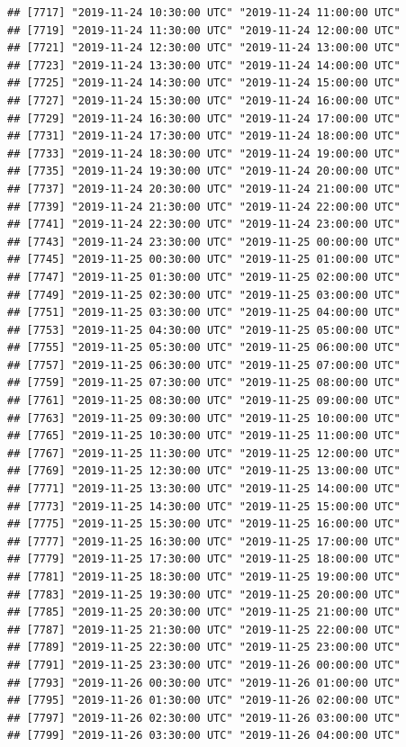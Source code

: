 \documentclass{article}\usepackage[]{graphicx}\usepackage[]{color}
\makeatletter
\newenvironment{kframe}{%
 \def\at@end@of@kframe{}%
 \ifinner\ifhmode%
  \def\at@end@of@kframe{\end{minipage}}%
  \begin{minipage}{\columnwidth}%
 \fi\fi%
 \def\FrameCommand##1{\hskip\@totalleftmargin \hskip-\fboxsep
 \colorbox{shadecolor}{##1}\hskip-\fboxsep
     \hskip-\linewidth \hskip-\@totalleftmargin \hskip\columnwidth}%
 \MakeFramed {\advance\hsize-\width
   \@totalleftmargin\z@ \linewidth\hsize
   \@setminipage}}%
 {\par\unskip\endMakeFramed%
 \at@end@of@kframe}
\newenvironment{knitrout}{}{} %
\makeatother
\begin{document}
\begin{knitrout}
\begin{kframe}
\begin{verbatim}
## [7717] "2019-11-24 10:30:00 UTC" "2019-11-24 11:00:00 UTC"
## [7719] "2019-11-24 11:30:00 UTC" "2019-11-24 12:00:00 UTC"
## [7721] "2019-11-24 12:30:00 UTC" "2019-11-24 13:00:00 UTC"
## [7723] "2019-11-24 13:30:00 UTC" "2019-11-24 14:00:00 UTC"
## [7725] "2019-11-24 14:30:00 UTC" "2019-11-24 15:00:00 UTC"
## [7727] "2019-11-24 15:30:00 UTC" "2019-11-24 16:00:00 UTC"
## [7729] "2019-11-24 16:30:00 UTC" "2019-11-24 17:00:00 UTC"
## [7731] "2019-11-24 17:30:00 UTC" "2019-11-24 18:00:00 UTC"
## [7733] "2019-11-24 18:30:00 UTC" "2019-11-24 19:00:00 UTC"
## [7735] "2019-11-24 19:30:00 UTC" "2019-11-24 20:00:00 UTC"
## [7737] "2019-11-24 20:30:00 UTC" "2019-11-24 21:00:00 UTC"
## [7739] "2019-11-24 21:30:00 UTC" "2019-11-24 22:00:00 UTC"
## [7741] "2019-11-24 22:30:00 UTC" "2019-11-24 23:00:00 UTC"
## [7743] "2019-11-24 23:30:00 UTC" "2019-11-25 00:00:00 UTC"
## [7745] "2019-11-25 00:30:00 UTC" "2019-11-25 01:00:00 UTC"
## [7747] "2019-11-25 01:30:00 UTC" "2019-11-25 02:00:00 UTC"
## [7749] "2019-11-25 02:30:00 UTC" "2019-11-25 03:00:00 UTC"
## [7751] "2019-11-25 03:30:00 UTC" "2019-11-25 04:00:00 UTC"
## [7753] "2019-11-25 04:30:00 UTC" "2019-11-25 05:00:00 UTC"
## [7755] "2019-11-25 05:30:00 UTC" "2019-11-25 06:00:00 UTC"
## [7757] "2019-11-25 06:30:00 UTC" "2019-11-25 07:00:00 UTC"
## [7759] "2019-11-25 07:30:00 UTC" "2019-11-25 08:00:00 UTC"
## [7761] "2019-11-25 08:30:00 UTC" "2019-11-25 09:00:00 UTC"
## [7763] "2019-11-25 09:30:00 UTC" "2019-11-25 10:00:00 UTC"
## [7765] "2019-11-25 10:30:00 UTC" "2019-11-25 11:00:00 UTC"
## [7767] "2019-11-25 11:30:00 UTC" "2019-11-25 12:00:00 UTC"
## [7769] "2019-11-25 12:30:00 UTC" "2019-11-25 13:00:00 UTC"
## [7771] "2019-11-25 13:30:00 UTC" "2019-11-25 14:00:00 UTC"
## [7773] "2019-11-25 14:30:00 UTC" "2019-11-25 15:00:00 UTC"
## [7775] "2019-11-25 15:30:00 UTC" "2019-11-25 16:00:00 UTC"
## [7777] "2019-11-25 16:30:00 UTC" "2019-11-25 17:00:00 UTC"
## [7779] "2019-11-25 17:30:00 UTC" "2019-11-25 18:00:00 UTC"
## [7781] "2019-11-25 18:30:00 UTC" "2019-11-25 19:00:00 UTC"
## [7783] "2019-11-25 19:30:00 UTC" "2019-11-25 20:00:00 UTC"
## [7785] "2019-11-25 20:30:00 UTC" "2019-11-25 21:00:00 UTC"
## [7787] "2019-11-25 21:30:00 UTC" "2019-11-25 22:00:00 UTC"
## [7789] "2019-11-25 22:30:00 UTC" "2019-11-25 23:00:00 UTC"
## [7791] "2019-11-25 23:30:00 UTC" "2019-11-26 00:00:00 UTC"
## [7793] "2019-11-26 00:30:00 UTC" "2019-11-26 01:00:00 UTC"
## [7795] "2019-11-26 01:30:00 UTC" "2019-11-26 02:00:00 UTC"
## [7797] "2019-11-26 02:30:00 UTC" "2019-11-26 03:00:00 UTC"
## [7799] "2019-11-26 03:30:00 UTC" "2019-11-26 04:00:00 UTC"

\end{verbatim}
\end{kframe}
\end{knitrout}
\end{document}
